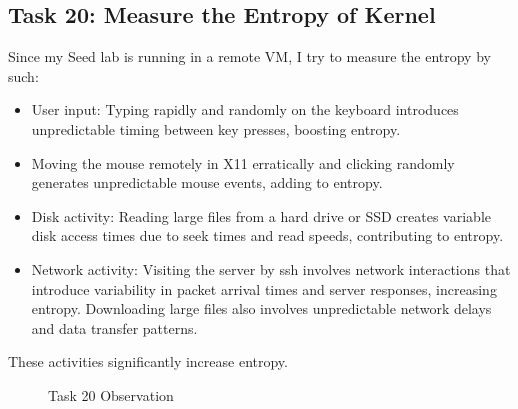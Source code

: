 \documentclass[a4paper]{article}
\begin{document}
\subsection{Task 20: Measure the Entropy of Kernel}
Since my Seed lab is running in a remote VM, I try to measure the entropy by such:
\begin{itemize}
    \item User input:
    Typing rapidly and randomly on the keyboard introduces unpredictable timing between key presses, boosting entropy.
    \item Moving the mouse remotely in X11 erratically and clicking randomly generates unpredictable mouse events, adding to entropy.
    \item Disk activity:
    Reading large files from a hard drive or SSD creates variable disk access times due to seek times and read speeds, contributing to entropy.
    \item Network activity:
    Visiting the server by ssh involves network interactions that introduce variability in packet arrival times and server responses, increasing entropy.
    Downloading large files also involves unpredictable network delays and data transfer patterns.
\end{itemize}
These activities significantly increase entropy.
\begin{figure}[h]
    \centering
    \hfill
    \hfill
    \caption{Task 20 Observation}\label{fig:task20}
\end{figure}
\end{document}
